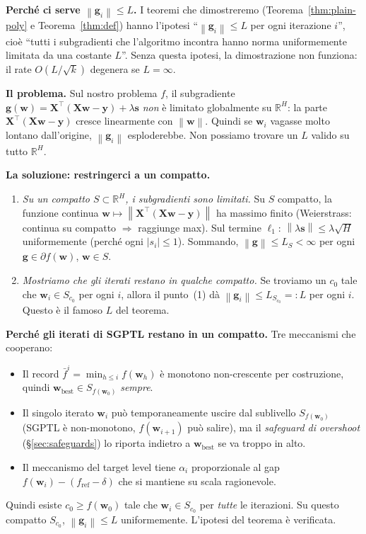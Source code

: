 \documentclass[11pt,a4paper]{article}
\newcommand{\R}{\mathbb{R}}
\newcommand{\norm}[1]{\left\|#1\right\|}
\newcommand{\bw}{\mathbf{w}}
\newcommand{\bg}{\mathbf{g}}
\newcommand{\by}{\mathbf{y}}
\newcommand{\bX}{\mathbf{X}}
\newcommand{\bs}{\mathbf{s}}
\theoremstyle{definition}
\begin{document}
\smallskip
\textbf{Perché ci serve $\norm{\bg_i}\le L$.} I teoremi che dimostreremo (Teorema~\ref{thm:plain-poly} e Teorema~\ref{thm:def}) hanno l'ipotesi ``$\norm{\bg_i}\le L$ per ogni iterazione $i$'', cioè ``tutti i subgradienti che l'algoritmo incontra hanno norma uniformemente limitata da una costante $L$''. Senza questa ipotesi, la dimostrazione non funziona: il rate $O(L/\sqrt k)$ degenera se $L=\infty$.

\smallskip
\textbf{Il problema.} Sul nostro problema $f$, il subgradiente $\bg(\bw) = \bX^\top(\bX\bw-\by) + \lambda\bs$ \emph{non} è limitato globalmente su $\R^H$: la parte $\bX^\top(\bX\bw-\by)$ cresce linearmente con $\norm{\bw}$. Quindi se $\bw_i$ vagasse molto lontano dall'origine, $\norm{\bg_i}$ esploderebbe. Non possiamo trovare un $L$ valido su tutto $\R^H$.

\smallskip
\textbf{La soluzione: restringerci a un compatto.}
\begin{enumerate}[label=(\arabic*),leftmargin=*]
\item \emph{Su un compatto $S\subset\R^H$, i subgradienti sono limitati.} Su $S$ compatto, la funzione continua $\bw\mapsto\norm{\bX^\top(\bX\bw-\by)}$ ha massimo finito (Weierstrass: continua su compatto $\Rightarrow$ raggiunge max). Sul termine $\ell_1$: $\norm{\lambda\bs}\le\lambda\sqrt H$ uniformemente (perché ogni $|s_i|\le 1$). Sommando, $\norm{\bg}\le L_S < \infty$ per ogni $\bg\in\partial f(\bw)$, $\bw\in S$.
\item \emph{Mostriamo che gli iterati restano in qualche compatto.} Se troviamo un $c_0$ tale che $\bw_i\in S_{c_0}$ per ogni $i$, allora il punto~(1) dà $\norm{\bg_i}\le L_{S_{c_0}} =: L$ per ogni $i$. Questo è il famoso $L$ del teorema.
\end{enumerate}

\smallskip
\textbf{Perché gli iterati di SGPTL restano in un compatto.} Tre meccanismi che cooperano:
\begin{itemize}[leftmargin=*]
\item Il record $\bar f^i = \min_{h\le i} f(\bw_h)$ è monotono non-crescente per costruzione, quindi $\bw_{\text{best}}\in S_{f(\bw_0)}$ \emph{sempre}.
\item Il singolo iterato $\bw_i$ può temporaneamente uscire dal sublivello $S_{f(\bw_0)}$ (SGPTL è non-monotono, $f(\bw_{i+1})$ può salire), ma il \emph{safeguard di overshoot} (\S\ref{sec:safeguards}) lo riporta indietro a $\bw_{\text{best}}$ se va troppo in alto.
\item Il meccanismo del target level tiene $\alpha_i$ proporzionale al gap $f(\bw_i)-(f_{\mathrm{ref}}-\delta)$ che si mantiene su scala ragionevole.
\end{itemize}
Quindi esiste $c_0\ge f(\bw_0)$ tale che $\bw_i\in S_{c_0}$ per \emph{tutte} le iterazioni. Su questo compatto $S_{c_0}$, $\norm{\bg_i}\le L$ uniformemente. L'ipotesi del teorema è verificata.
\end{document}
